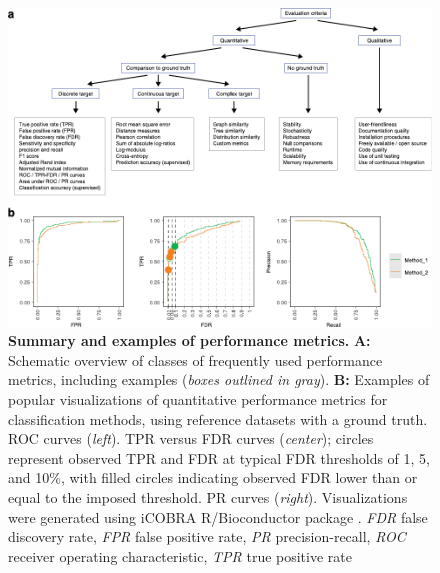 \begin{figure}[htb!]
	\centering
	\includegraphics[width=\hugefigure]{fig/essential_guidelines_figure2} 
	\caption{\textbf{Summary and examples of performance metrics.} \textbf{A:} Schematic overview of classes of frequently used performance metrics, including examples (\textit{boxes outlined in gray}). \textbf{B:} Examples of popular visualizations of quantitative performance metrics for classification methods, using reference datasets with a ground truth. ROC curves (\textit{left}). TPR versus FDR curves (\textit{center}); circles represent observed TPR and FDR at typical FDR thresholds of 1, 5, and 10\%, with filled circles indicating observed FDR lower than or equal to the imposed threshold. PR curves (\textit{right}). Visualizations were generated using iCOBRA R/Bioconductor package \cite{soneson_icobraopenreproducible_2016}. \textit{FDR} false discovery rate, \textit{FPR} false positive rate, \textit{PR} precision-recall, \textit{ROC} receiver operating characteristic, \textit{TPR} true positive rate}
	\label{fig:fig2_metrics}
\end{figure}


